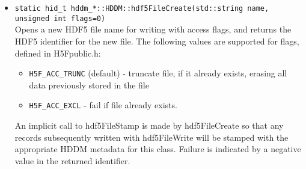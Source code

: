 \documentclass{revtex4}
\begin{document}
\begin{itemize}
\item \texttt{static hid\_t hddm\_*::HDDM::hdf5FileCreate(std::string name, unsigned int flags=0)}\\
Opens a new HDF5 file name for writing with access flags, and returns the HDF5
identifier for the new file. The following values are supported for flags, defined
in H5Fpublic.h:
\begin{itemize}
\item \texttt{H5F\_ACC\_TRUNC} (default) - truncate file, if it already exists, 
erasing all data previously stored in the file
\item \texttt{H5F\_ACC\_EXCL} - fail if file already exists.
\end{itemize}
An implicit call to hdf5FileStamp is made by hdf5FileCreate so that any records
subsequently written with hdf5FileWrite will be stamped with the appropriate HDDM
metadata for this class. Failure is indicated by a negative value in the returned
identifier.


\end{itemize}
\end{document}
